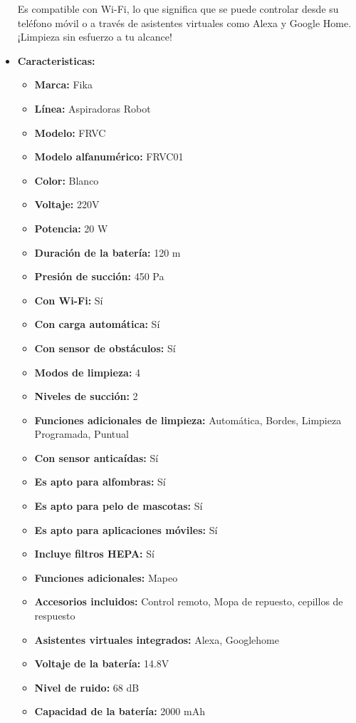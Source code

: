 \documentclass{article}
\begin{document}
\begin{adjustwidth}{2em}{}
\begin{itemize}
Es compatible con Wi-Fi, lo que significa que se puede controlar desde su teléfono móvil o a través de asistentes virtuales como Alexa y Google Home. ¡Limpieza sin esfuerzo a tu alcance!
        \item \textbf{Caracteristicas:} 
        \begin{itemize}
            \item \textbf {Marca:} Fika
    \item \textbf {Línea:} Aspiradoras Robot
    \item \textbf {Modelo:} FRVC
    \item \textbf {Modelo alfanumérico:} FRVC01
    \item \textbf {Color:} Blanco
    \item \textbf {Voltaje:} 220V
    \item \textbf {Potencia:} 20 W
    \item \textbf {Duración de la batería:} 120 m
    \item \textbf {Presión de succión:} 450 Pa
    \item \textbf {Con Wi-Fi:} Sí
    \item \textbf {Con carga automática:} Sí
    \item \textbf {Con sensor de obstáculos:} Sí
    \item \textbf {Modos de limpieza:} 4
    \item \textbf {Niveles de succión:} 2
    \item \textbf {Funciones adicionales de limpieza:} Automática, Bordes, Limpieza Programada, Puntual
    \item \textbf {Con sensor anticaídas:} Sí
    \item \textbf {Es apto para alfombras:} Sí
    \item \textbf {Es apto para pelo de mascotas:} Sí
    \item \textbf {Es apto para aplicaciones móviles:} Sí
    \item \textbf {Incluye filtros HEPA:} Sí
    \item \textbf {Funciones adicionales:} Mapeo
    \item \textbf {Accesorios incluidos:} Control remoto, Mopa de repuesto, cepillos de respuesto
    \item \textbf {Asistentes virtuales integrados:} Alexa, Googlehome
    \item \textbf {Voltaje de la batería:} 14.8V
    \item \textbf {Nivel de ruido:} 68 dB
    \item \textbf {Capacidad de la batería:} 2000 mAh

\end{itemize}
\end{itemize}
\end{adjustwidth}
\end{document}
